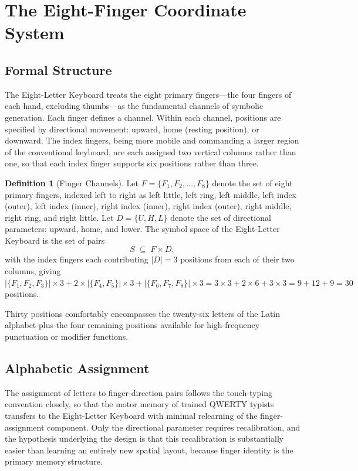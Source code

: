 \documentclass[12pt,a4paper]{article}
\theoremstyle{plain}
\theoremstyle{definition}
\newtheorem{definition}{Definition}
\theoremstyle{remark}
\begin{document}
\section{The Eight-Finger Coordinate System}

\subsection{Formal Structure}

The Eight-Letter Keyboard treats the eight primary fingers---the four fingers
of each hand, excluding thumbs---as the fundamental channels of symbolic
generation. Each finger defines a channel. Within each channel, positions are
specified by directional movement: upward, home (resting position), or downward.
The index fingers, being more mobile and commanding a larger region of the
conventional keyboard, are each assigned two vertical columns rather than one,
so that each index finger supports six positions rather than three.

\begin{definition}[Finger Channels]
Let $F = \{F_1, F_2, \ldots, F_8\}$ denote the set of eight primary fingers,
indexed left to right as left little, left ring, left middle, left index (outer),
left index (inner), right index (inner), right index (outer), right middle, right
ring, and right little. Let $D = \{U, H, L\}$ denote the set of directional
parameters: upward, home, and lower. The symbol space of the Eight-Letter
Keyboard is the set of pairs
\[
  S \;\subseteq\; F \times D,
\]
with the index fingers each contributing $|D| = 3$ positions from each of their
two columns, giving $|\{F_1, F_2, F_3\}| \times 3 + 2 \times |\{F_4, F_5\}|
\times 3 + |\{F_6, F_7, F_8\}| \times 3 = 3 \times 3 + 2 \times 6 + 3 \times 3
= 9 + 12 + 9 = 30$ positions.
\end{definition}

Thirty positions comfortably encompasses the twenty-six letters of the Latin
alphabet plus the four remaining positions available for high-frequency
punctuation or modifier functions.

\subsection{Alphabetic Assignment}

The assignment of letters to finger-direction pairs follows the touch-typing
convention closely, so that the motor memory of trained QWERTY typists transfers
to the Eight-Letter Keyboard with minimal relearning of the finger-assignment
component. Only the directional parameter requires recalibration, and the
hypothesis underlying the design is that this recalibration is substantially
easier than learning an entirely new spatial layout, because finger identity is
the primary memory structure.
\end{document}
